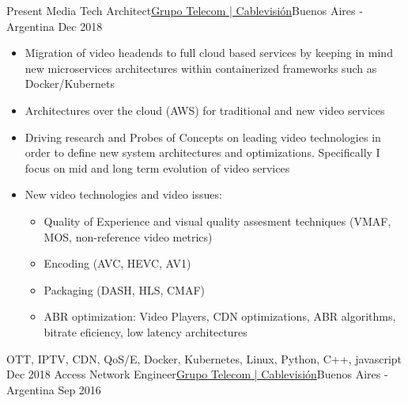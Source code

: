 %
%
%

\begin{experiences}
  \experience
    {Present}   {Media Tech Architect}{\href{https://www.cablevisionfibertel.com.ar/}{\color{accentcolor}Grupo Telecom | Cablevisión}}{Buenos Aires - Argentina}
    {Dec 2018} {
                      \begin{itemize}
                      \item Migration of video headends to full cloud based services by keeping in mind new microservices architectures within containerized frameworks such as Docker/Kubernets
                      \item Architectures over the cloud (AWS) for traditional and new video services
                      \item Driving research and Probes of Concepts on leading video technologies in order to define new system architectures and optimizations. Specifically I focus on mid and long term evolution of video services
                      \item New video technologies and video issues:
                        \begin{itemize}
                        \item Quality of Experience and visual quality assesment techniques (VMAF, MOS, non-reference video metrics)
                        \item Encoding (AVC, HEVC, AV1)
                        \item Packaging (DASH, HLS, CMAF) 
                        \item ABR optimization: Video Players, CDN optimizations, ABR algorithms, bitrate eficiency, low latency architectures
                        \end{itemize}
                      \end{itemize}
                    }
                    {OTT, IPTV, CDN, QoS/E, Docker, Kubernetes, Linux, Python, C++, javascript}
  \emptySeparator
  \experience
    {Dec 2018} {Access Network  Engineer}{\href{https://www.cablevisionfibertel.com.ar/}{\color{accentcolor}Grupo Telecom | Cablevisión}}{Buenos Aires - Argentina}
    {Sep 2016}    {
}
\end{experiences}
